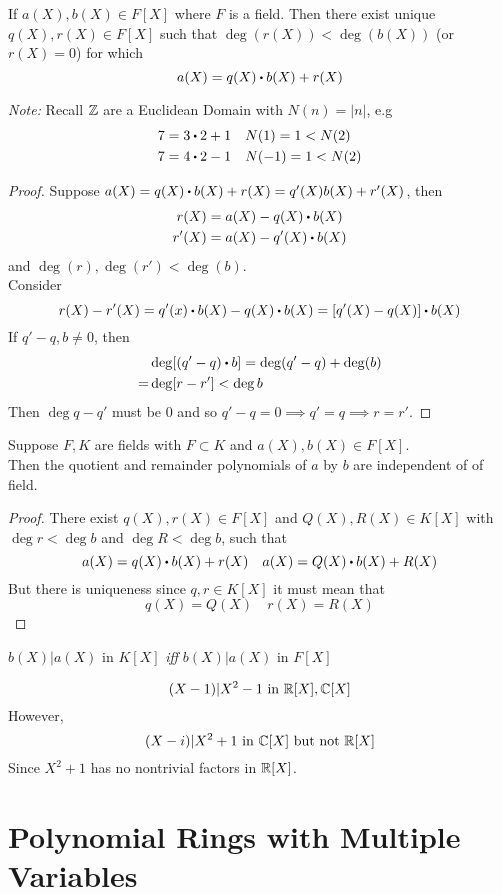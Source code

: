 \documentclass[../Main.tex]{subfiles}
\begin{document}
\begin{thm}[title = \texorpdfstring{$F[X]$}{F[X]} satisfies euclidean condition]
	If $a(X),b(X)\in F[X]$ where $F$ is a field. Then there exist unique $q(X),r(X)\in F[X]$ such that $\deg (r(X)) < \deg (b(X))$ (or $r(X)=0$) for which \[a(X)=q(X)\rdot b(X)+r(X)\]
\end{thm}
\textit{Note:} Recall $\mathbb{Z}$ are a Euclidean Domain with $N(n)=|n|$, e.g
\begin{align*}
7=3\rdot 2+1&\quad N(1)=1<N(2)\\
7=4\rdot 2-1&\quad N(-1)=1<N(2)
\end{align*}
\begin{proof}
	Suppose $a(X)=q(X)\rdot b(X)+r(X)=q'(X)b(X)+r'(X)$, then
	\begin{align*}
	r(X)&=a(X)-q(X)\rdot b(X)\\
	r'(X)&=a(X)-q'(X)\rdot b(X)
	\end{align*}
	and $\deg(r),\deg(r')<\deg(b)$.\\
	Consider
	\[r(X)-r'(X)=q'(x)\rdot b(X)-q(X)\rdot b(X) = [q'(X)-q(X)]\rdot b(X)\]
	If $q'-q,b\ne 0$, then 
	\begin{align*}
	&\deg[(q'-q)\rdot b]=\deg(q'-q)+\deg(b)\\
	=&\deg[r-r']<\deg b
	\end{align*}
	Then $\deg{q-q'}$ must be $0$ and so $q'-q=0\implies q'=q\implies r=r'$.
\end{proof}
\begin{crl}[title = ]
	Suppose $F,K$ are fields with $F\subset K$ and $a(X),b(X)\in F[X]$. \\
	Then the quotient and remainder polynomials of $a$ by $b$ are independent of of field.
\end{crl}
\begin{proof}
	There exist $q(X),r(X)\in F[X]$ and $Q(X), R(X)\in K[X]$ with $\deg r< \deg b$ and $\deg R< \deg b$, such that
	\[a(X)=q(X)\rdot b(X)+r(X)\quad a(X)=Q(X)\rdot b(X)+R(X)\]
	But there is uniqueness since $q,r\in K[X]$ it must mean that
	\[q(X)=Q(X)\quad r(X)=R(X)\]
\end{proof}
\begin{crl}
	$b(X)|a(X)$ in $K[X]$ \textit{iff} $b(X)|a(X)$ in $F[X]$
\end{crl}
\begin{example}
	\[(X-1)|X^2-1 \text{ in } \mathbb{R}[X],\mathbb{C}[X]\]
	However,
	\[(X-i)| X^2+1 \text{ in } \mathbb{C}[X] \text{ but not } \mathbb{R}[X]\]
	Since $X^2+1$ has no nontrivial factors in $\mathbb{R}[X]$.
\end{example}
\section*{Polynomial Rings with Multiple Variables}
\end{document}
